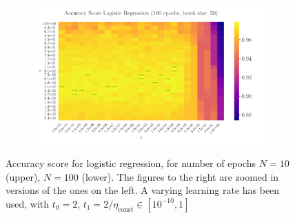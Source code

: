 \documentclass[%
reprint,s
amsmath,amssymb,
aps,
]{revtex4-2}
\begin{document}
\begin{figure}
\begin{subfigure}{0.41\textwidth}
		\label{fig:LogReg25x25_epoch100_bacthS50}
	\end{subfigure}
	\hfill
	\begin{subfigure}{0.41\textwidth}
		\includegraphics[width=\textwidth]{Figures/LogReg25x25_epoch100_batchS50_zoomed.pdf}
		\label{fig:LogReg25x25_epoch100_bacthS50_zoomed}
	\end{subfigure}
	\caption{Accuracy score for logistic regression, for number of epochs \(N=10\) (upper), \(N=100\) (lower). The figures to the right are zoomed in versions of the ones on the left. A varying learning rate has been used, with \(t_0=2\), \(t_{1} = 2/\eta_{\text{const}} \in [10^{-10}, 1]\)}
	\label{fig:LogReg}
\end{figure}
\end{document}
